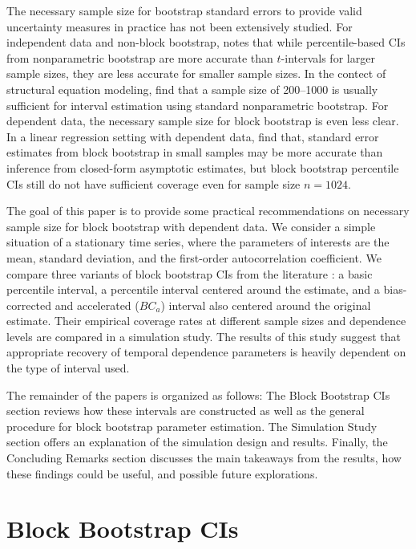 \documentclass[12pt, letterpaper, titlepage]{article}
\begin{document}
The necessary sample size for bootstrap standard errors to provide valid
uncertainty measures in practice has not been extensively studied. For
independent data and non-block bootstrap, \citet{hesterberg2015teachers} notes
that while percentile-based CIs from nonparametric bootstrap
are more accurate than $t$-intervals for larger sample sizes, they are
less accurate for smaller sample sizes. In the contect of structural equation
modeling, \citet{nevitt2001performance} find
that a sample size of 200--1000 is usually sufficient for interval estimation
using standard nonparametric bootstrap. For dependent data, the necessary sample
size for block bootstrap is even less clear. In a linear regression setting with
dependent data, \citet{goncalves2005bootstrap} find that, standard error
estimates from block bootstrap in small samples may be more accurate than
inference from closed-form asymptotic estimates, but block bootstrap percentile
CIs still do not have sufficient coverage even for sample size
$n = 1024$.


The goal of this paper is to provide some practical recommendations on
necessary sample size for block bootstrap with dependent data. We consider a
simple situation of a stationary time series, where the parameters of
interests are the mean, standard deviation, and the first-order
autocorrelation coefficient. We compare three variants of block bootstrap
CIs from the literature \citep{diciccio1996bootstrap,
  rice2006mathematical}: a basic percentile interval, a percentile
interval centered around the estimate, and a bias-corrected and
accelerated ($BC_a$) interval also centered around the original estimate. Their
empirical coverage rates at different sample sizes and dependence levels are
compared in a simulation study. The results of this study suggest that
appropriate recovery of temporal dependence parameters is heavily dependent on
the type of interval used.


The remainder of the papers is organized as follows:
The Block Bootstrap CIs section reviews how these intervals
are constructed as well as the general procedure for block bootstrap parameter
estimation. The Simulation Study section offers an explanation of the
simulation design and results. Finally, the Concluding Remarks section
discusses the main takeaways from the results, how these findings could be
useful, and possible future explorations.


\section{Block Bootstrap CIs}
\label{sec:blkbootreview}
\end{document}
